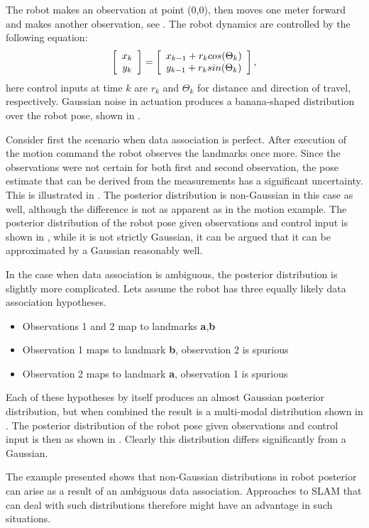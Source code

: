 The robot makes an observation at point (0,0), then moves one meter
forward and makes another observation,
see . The robot dynamics are controlled by
the following equation:
$$
  \left[\begin{array}{c} x_k\\y_k \end{array} \right] = \left[\begin{array}{c}  x_{k-1} + r_k cos(\Theta_k)\\
                               y_{k-1} + r_k sin(\Theta_k)  \end{array} \right],
$$
here control inputs at time $k$ are $r_k$ and $\Theta_k$ for distance
and direction of travel, respectively. Gaussian noise in actuation
produces a banana-shaped distribution over the robot pose, shown in
.

Consider first the scenario when data association is perfect. After
execution of the motion command the robot observes the landmarks once
more. Since the observations were not certain for both first and
second observation, the pose estimate that can be derived from the
measurements has a significant uncertainty. This is illustrated in
. The posterior distribution is non-Gaussian
in this case as well, although the difference is not as apparent as in
the motion example. The posterior distribution of the robot pose given
observations and control input is shown in
, while it is not strictly Gaussian, it can
be argued that it can be approximated by a Gaussian reasonably well.

In the case when data association is ambiguous, the posterior
distribution is slightly more complicated. Lets assume the robot has
three equally likely data association hypotheses. 

\begin{itemize}
\item Observations 1 and 2 map to landmarks {\bf a},{\bf b}
\item Observation 1 maps to landmark {\bf b}, observation 2 is spurious
\item Observation 2 maps to landmark {\bf a}, observation 1 is spurious
\end{itemize}

Each of these hypotheses by itself produces an almost Gaussian
posterior distribution, but when combined the result is a multi-modal
distribution shown in . The posterior
distribution of the robot pose given observations and control input is
then as shown in . Clearly this
distribution differs significantly from a Gaussian.

The example presented shows that non-Gaussian distributions in robot
posterior can arise as a result of an ambiguous data
association. Approaches to SLAM that can deal with such distributions
therefore might have an advantage in such situations.


